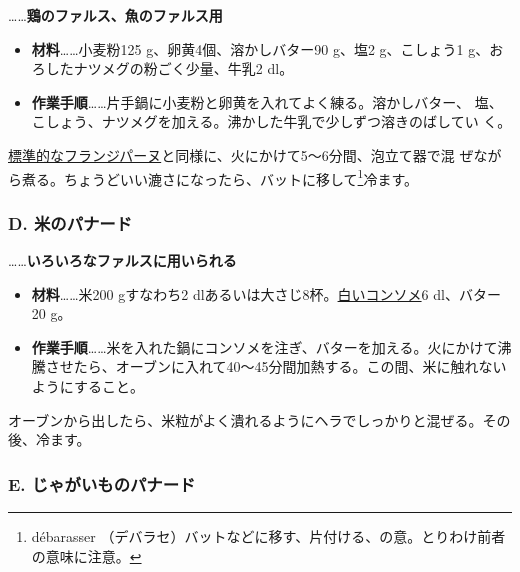 \begin{recette}
\ldots{}\ldots{}\textbf{鶏のファルス、魚のファルス用}

\begin{itemize}
\item
  \textbf{材料}\ldots{}\ldots{}小麦粉125 g、卵黄4個、溶かしバター90
  g、塩2 g、こしょう1 g、おろしたナツメグの粉ごく少量、牛乳2\undemi{}
  dl。
\item
  \textbf{作業手順}\ldots{}\ldots{}片手鍋に小麦粉と卵黄を入れてよく練る。溶かしバター、
  塩、こしょう、ナツメグを加える。沸かした牛乳で少しずつ溶きのばしてい
  く。
\end{itemize}

\protect\hyperlink{creme-frangipane}{標準的なフランジパーヌ}と同様に、火にかけて5〜6分間、泡立て器で混
ぜながら煮る。ちょうどいい漉さになったら、バットに移して\footnote{débarasser
  （デバラセ）バットなどに移す、片付ける、の意。とりわけ前者の意味に注意。}冷ます。

\maeaki

\hypertarget{panade-d}{%
\subsubsection{D. 米のパナード}\label{panade-d}}



\ldots{}\ldots{}\textbf{いろいろなファルスに用いられる}

\begin{itemize}
\item
  \textbf{材料}\ldots{}\ldots{}米200 gすなわち2
  dlあるいは大さじ8杯。\protect\hyperlink{}{白いコンソメ}6 dl、バター20
  g。
\item
  \textbf{作業手順}\ldots{}\ldots{}米を入れた鍋にコンソメを注ぎ、バターを加える。火にかけて沸騰させたら、オーブンに入れて40〜45分間加熱する。この間、米に触れないようにすること。
\end{itemize}

オーブンから出したら、米粒がよく潰れるようにヘラでしっかりと混ぜる。その後、冷ます。

\maeaki

\hypertarget{panade-e}{%
\subsubsection{E. じゃがいものパナード}\label{panade-e}}


\end{recette}
